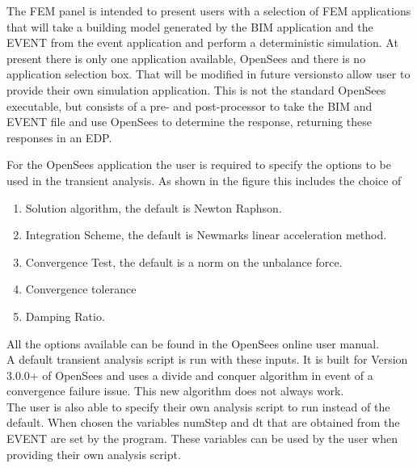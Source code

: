 The FEM panel is intended to present users with a selection of FEM applications that will take a building model generated by the BIM application and the EVENT from the event application and perform a deterministic simulation. 
At present there is only one application available, OpenSees and there is no application selection box.  That will be modified in future versionsto allow user to provide their own simulation application.  This is not the standard OpenSees executable, but consists of a pre- and post-processor to take the  BIM and EVENT file and use OpenSees to determine the response, returning these responses in an EDP. 

For the OpenSees application the user is required to specify the options to be used in the transient analysis. As shown in the figure this includes the choice of 
\begin{enumerate}
\item Solution algorithm, the default is Newton Raphson.
\item Integration Scheme, the default is Newmarks linear acceleration method.
\item Convergence Test, the default is a norm on the unbalance force.
\item Convergence tolerance
\item Damping Ratio.
\end{enumerate}

All the options available can be found in the OpenSees online user manual.\\

A default transient analysis script is run with these inputs. It is built for Version 3.0.0+ of OpenSees and uses a divide and conquer  algorithm in event of a convergence failure issue. This new algorithm does not always work. \\

The user is also able to specify their 
own analysis script to run instead of the default. When chosen the variables numStep and dt that are obtained from the EVENT are set by the program. These variables can be used by the user when providing their own analysis script.
